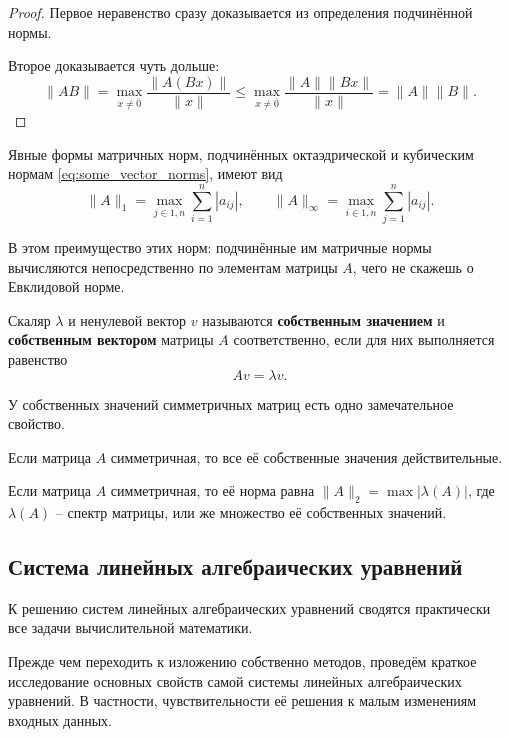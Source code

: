 \documentclass{article}
\begin{document}
\begin{proof}
	Первое неравенство сразу доказывается из определения подчинённой нормы.

	Второе доказывается чуть дольше:
	\[\|AB\|=\max_{x\ne\overline{0}}\frac{\|A(Bx)\|}{\|x\|}\le
	\max_{x\ne\overline{0}}\frac{\|A\|\|Bx\|}{\|x\|}=\|A\|\|B\|.\]
\end{proof}

\begin{lemma}
	Явные формы матричных норм, подчинённых октаэдрической и кубическим
	нормам \eqref{eq:some_vector_norms}, имеют вид
	\[\|A\|_1=\max_{j\in\overline{1,n}}\sum_{i=1}^{n}|a_{ij}|,\qquad
	\|A\|_\infty=\max_{i\in\overline{1,n}}\sum_{j=1}^{n}|a_{ij}|.\]
\end{lemma}

\proofexercise

В этом преимущество этих норм: подчинённые им матричные нормы вычисляются
непосредственно по элементам матрицы $A$, чего не скажешь о Евклидовой норме.

\begin{define}
	Скаляр $\lambda$ и ненулевой вектор $v$ называются \textbf{собственным
	значением} и \textbf{собственным вектором} матрицы $A$ соответственно,
	если для них выполняется равенство
	\[Av=\lambda v.\]
\end{define}

У собственных значений симметричных матриц есть одно замечательное свойство.
\begin{lemma}
	Если матрица $A$ симметричная, то все её собственные значения
	действительные.
\end{lemma}

\begin{theorem}
\label{eq:symmetric_matrix_norm}
	Если матрица $A$ симметричная, то её норма равна $\|A\|_2=
	\max|\lambda(A)|$, где $\lambda(A)$ -- спектр матрицы, или же множество
	её собственных значений.
\end{theorem}
\newpage

\subsection{Система линейных алгебраических уравнений}
К решению систем линейных алгебраических уравнений сводятся практически все
задачи вычислительной математики.

Прежде чем переходить к изложению собственно методов, проведём краткое
исследование основных свойств самой системы линейных алгебраических уравнений. В
частности, чувствительности её решения к малым изменениям входных данных.
\end{document}
